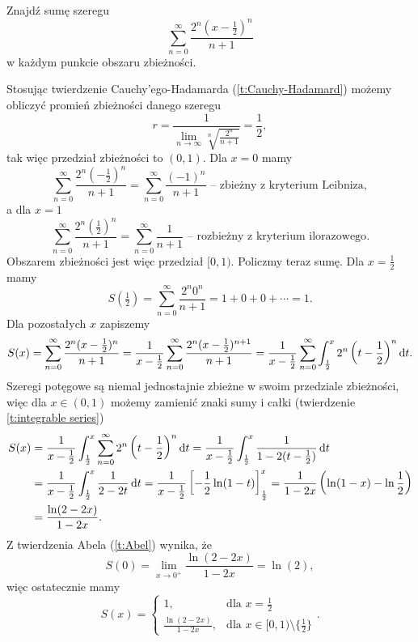 \begin{example}
    Znajdź sumę szeregu
    \[ \sum_{n=0}^\infty \frac{2^n(x - \frac{1}{2})^n}{n+1} \]
    w każdym punkcie obszaru zbieżności.
\end{example}
\begin{solution}
    Stosując twierdzenie Cauchy'ego-Hadamarda (\ref{t:Cauchy-Hadamard}) możemy obliczyć promień zbieżności danego szeregu
    \[ r = \frac{1}{\lim\limits_{n\to\infty}\sqrt[n]{\frac{2^n}{n+1}}} = \frac{1}{2}, \]
    tak więc przedział zbieżności to $(0, 1)$.
    Dla $x = 0$ mamy
    \[ \sum_{n=0}^\infty \frac{2^n\left(-\frac{1}{2}\right)^n}{n+1} = \sum_{n=0}^\infty \frac{(-1)^n}{n+1} \text{ -- zbieżny z kryterium Leibniza}, \]
    a dla $x = 1$
    \[ \sum_{n=0}^\infty \frac{2^n\left(\frac{1}{2}\right)^n}{n+1} = \sum_{n=0}^\infty \frac{1}{n+1} \text{ -- rozbieżny z kryterium ilorazowego}. \]
    Obszarem zbieżności jest więc przedział $[0, 1)$. Policzmy teraz sumę. Dla $x = \frac{1}{2}$ mamy
    \[ S(\tfrac{1}{2}) = \sum_{n=0}^\infty \frac{2^n0^n}{n+1} = 1 + 0 + 0 + \cdots = 1. \]
    Dla pozostałych $x$ zapiszemy
    \[ S(x) = \sum_{n=0}^\infty \frac{2^n(x - \frac{1}{2})^n}{n+1} = \frac{1}{x - \frac{1}{2}}\sum_{n=0}^\infty \frac{2^n(x - \frac{1}{2})^{n+1}}{n+1} = \frac{1}{x - \frac{1}{2}}\sum_{n=0}^\infty \int_{\frac{1}{2}}^x 2^n\left(t-\frac{1}{2}\right)^n\operatorname{d}\!{t}. \]
    Szeregi potęgowe są niemal jednostajnie zbieżne w swoim przedziale zbieżności, więc dla $x \in (0, 1)$ możemy zamienić znaki sumy i całki (twierdzenie \ref{t:integrable series})
    \begin{align*}
        S(x) &= \frac{1}{x - \frac{1}{2}}\int_{\frac{1}{2}}^x \sum_{n=0}^\infty 2^n\left(t-\frac{1}{2}\right)^n\operatorname{d}\!{t} = \frac{1}{x - \frac{1}{2}}\int_{\frac{1}{2}}^x \frac{1}{1 - 2(t - \frac{1}{2})}\operatorname{d}\!{t} \\
        &= \frac{1}{x - \frac{1}{2}}\int_{\frac{1}{2}}^x \frac{1}{2 - 2t}\operatorname{d}\!{t} = \frac{1}{x - \frac{1}{2}}\left[-\frac{1}{2}\ln(1 - t)\right]_{\frac{1}{2}}^x = \frac{1}{1 - 2x}\left(\ln(1 - x) - \ln{\frac{1}{2}}\right) \\
        &= \frac{\ln(2 - 2x)}{1 - 2x}.
    \end{align*}
    Z twierdzenia Abela (\ref{t:Abel}) wynika, że
    \[ S(0) = \lim_{x\to 0^+}\frac{\ln(2 - 2x)}{1 - 2x} = \ln(2), \]
    więc ostatecznie mamy
    \[ S(x) = \begin{cases}1, & \text{dla } x = \tfrac{1}{2} \\ \frac{\ln(2 - 2x)}{1 - 2x}, & \text{dla } x \in [0, 1)\setminus \{\tfrac{1}{2}\} \end{cases}. \]
\end{solution}

